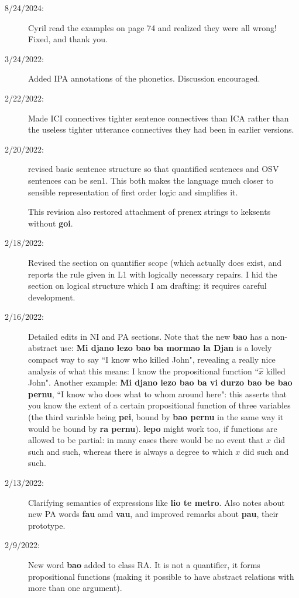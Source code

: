 \documentclass[12pt]{book}
\begin{document}
\begin{description}
\item[8/24/2024:]  Cyril read the examples on page 74 and realized they were all wrong!   Fixed, and thank you.

\item[3/24/2022:]  Added IPA annotations of the phonetics.   Discussion encouraged.

\item[2/22/2022:]  Made ICI connectives tighter sentence connectives than ICA rather than the useless tighter utterance connectives they had been in earlier versions.

\item[2/20/2022:]  revised basic sentence structure so that quantified sentences and OSV sentences can be sen1.  This both makes the language much closer to sensible representation of first order logic and simplifies it.

This revision also restored attachment of prenex strings to keksents without {\bf goi}.

\item[2/18/2022:]  Revised the section on quantifier scope (which actually does exist, and reports the rule given in L1 with logically necessary repairs.  I hid the section on logical structure which I am drafting:  it requires careful development.

\item[2/16/2022:]  Detailed edits in NI and PA sections.  Note that the new {\bf bao} has a non-abstract use: {\bf Mi djano lezo bao ba mormao la Djan} is a lovely compact way to say ``I know who killed John", revealing a really nice analysis of what this means:  I know the propositional function ``$\hat x$ killed John".  Another example: {\bf Mi djano lezo bao ba vi durzo bao be bao pernu}, ``I know who does what to whom around here":  this asserts that you know the extent of a certain propositional function of three variables (the third variable being {\bf pei}, bound by {\bf bao pernu} in the same way it would be bound by {\bf ra pernu}).  {\bf lepo} might work too, if functions are allowed to be partial:  in many cases there would be no event that $x$ did such and such, whereas there is always a degree to which $x$ did such and such.

\item[2/13/2022:]  Clarifying semantics of expressions like {\bf lio te metro}.  Also notes about new PA words {\bf fau} amd {\bf vau}, and improved remarks about {\bf pau}, their prototype.

\item[2/9/2022:]  New word {\bf bao}  added to class RA.  It is not a quantifier, it forms propositional functions (making it possible to have abstract relations with more than one argument).


\end{description}
\end{document}
